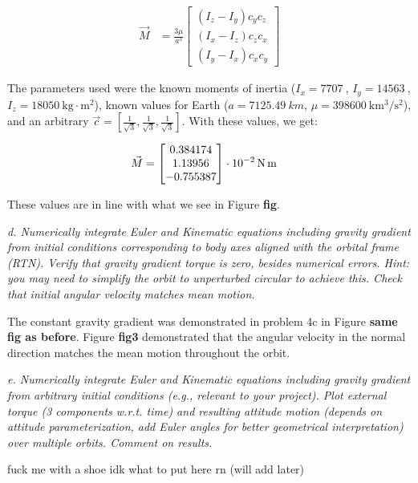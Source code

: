 \begin{align*}
    \Vec{M} &= \frac{3 \mu}{a^3}
    \begin{bmatrix}
    (I_z - I_y) c_y c_z \\
    (I_x - I_z) c_z c_x \\
    (I_y - I_x) c_x c_y
    \end{bmatrix}
\end{align*}

The parameters used were the known moments of inertia ($I_x = \qty{7707}{}$, $I_y = \qty{14563}{}$, $I_z = \qty{18050}{\kilogram\cdot\meter^2}$), known values for Earth ($a = \qty{7125.49}{km}$, $\mu = \qty{398600}{\km^3\per\second^2}$), and an arbitrary $\Vec{c} = [\frac{1}{\sqrt{3}}, \frac{1}{\sqrt{3}}, \frac{1}{\sqrt{3}}]$. With these values, we get:

\begin{align*}
    \Vec{M} &=
\qty[parse-numbers = false]{
    \begin{bmatrix}
    0.384174 \\
    1.13956 \\
    -0.755387
    \end{bmatrix}
    \cdot
    10^{-2}
}{\newton\meter}
\end{align*}

These values are in line with what we see in Figure \textbf{fig}.

\textit{d. Numerically integrate Euler and Kinematic equations including gravity gradient from initial conditions corresponding to body axes aligned with the orbital frame (RTN). Verify that gravity gradient torque is zero, besides numerical errors. Hint: you may need to simplify the orbit to unperturbed circular to achieve this. Check that initial angular velocity matches mean motion.}

The constant gravity gradient was demonstrated in problem 4c in Figure \textbf{same fig as before}. Figure \textbf{fig3} demonstrated that the angular velocity in the normal direction matches the mean motion throughout the orbit.

\textit{e. Numerically integrate Euler and Kinematic equations including gravity gradient from arbitrary initial conditions (e.g., relevant to your project). Plot external torque (3 components w.r.t. time) and resulting attitude motion (depends on attitude parameterization, add Euler angles for better geometrical interpretation) over multiple orbits. Comment on results.}

fuck me with a shoe idk what to put here rn (will add later)